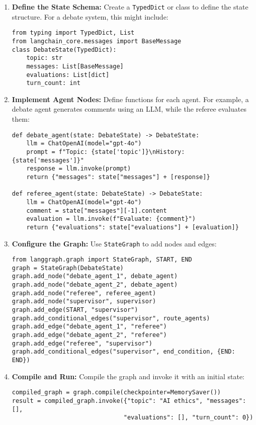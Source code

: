 \documentclass{article}
\begin{document}
\begin{enumerate}
    \item \textbf{Define the State Schema:} Create a \texttt{TypedDict} or class to define the state structure. For a debate system, this might include:
    \begin{verbatim}
from typing import TypedDict, List
from langchain_core.messages import BaseMessage
class DebateState(TypedDict):
    topic: str
    messages: List[BaseMessage]
    evaluations: List[dict]
    turn_count: int
    \end{verbatim}

    \item \textbf{Implement Agent Nodes:} Define functions for each agent. For example, a debate agent generates comments using an LLM, while the referee evaluates them:
    \begin{verbatim}
def debate_agent(state: DebateState) -> DebateState:
    llm = ChatOpenAI(model="gpt-4o")
    prompt = f"Topic: {state['topic']}\nHistory: {state['messages']}"
    response = llm.invoke(prompt)
    return {"messages": state["messages"] + [response]}

def referee_agent(state: DebateState) -> DebateState:
    llm = ChatOpenAI(model="gpt-4o")
    comment = state["messages"][-1].content
    evaluation = llm.invoke(f"Evaluate: {comment}")
    return {"evaluations": state["evaluations"] + [evaluation]}
    \end{verbatim}

    \item \textbf{Configure the Graph:} Use \texttt{StateGraph} to add nodes and edges:
    \begin{verbatim}
from langgraph.graph import StateGraph, START, END
graph = StateGraph(DebateState)
graph.add_node("debate_agent_1", debate_agent)
graph.add_node("debate_agent_2", debate_agent)
graph.add_node("referee", referee_agent)
graph.add_node("supervisor", supervisor)
graph.add_edge(START, "supervisor")
graph.add_conditional_edges("supervisor", route_agents)
graph.add_edge("debate_agent_1", "referee")
graph.add_edge("debate_agent_2", "referee")
graph.add_edge("referee", "supervisor")
graph.add_conditional_edges("supervisor", end_condition, {END: END})
    \end{verbatim}

    \item \textbf{Compile and Run:} Compile the graph and invoke it with an initial state:
    \begin{verbatim}
compiled_graph = graph.compile(checkpointer=MemorySaver())
result = compiled_graph.invoke({"topic": "AI ethics", "messages": [],
                               "evaluations": [], "turn_count": 0})
    \end{verbatim}
\end{enumerate}
\end{document}
